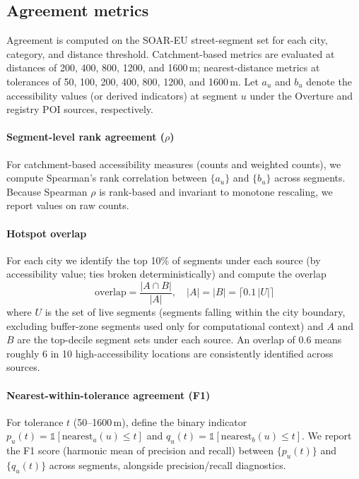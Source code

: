 \subsection{Agreement metrics}
\label{sec:poi-supp-metrics}

Agreement is computed on the SOAR-EU street-segment set for each city, category, and distance threshold. Catchment-based metrics are evaluated at distances of 200, 400, 800, 1200, and 1600\,m; nearest-distance metrics at tolerances of 50, 100, 200, 400, 800, 1200, and 1600\,m. Let $a_u$ and $b_u$ denote the accessibility values (or derived indicators) at segment $u$ under the Overture and registry POI sources, respectively.

\paragraph{Segment-level rank agreement ($\rho$)} For catchment-based accessibility measures (counts and weighted counts), we compute Spearman's rank correlation between $\{a_u\}$ and $\{b_u\}$ across segments. Because Spearman $\rho$ is rank-based and invariant to monotone rescaling, we report values on raw counts.

\paragraph{Hotspot overlap} For each city we identify the top 10\% of segments under each source (by accessibility value; ties broken deterministically) and compute the overlap
\[
  \mathrm{overlap}=\frac{|A\cap B|}{|A|},\quad |A|=|B|=\lceil 0.1\,|U|\rceil
\]
where $U$ is the set of live segments (segments falling within the city boundary, excluding buffer-zone segments used only for computational context) and $A$ and $B$ are the top-decile segment sets under each source. An overlap of 0.6 means roughly 6 in 10 high-accessibility locations are consistently identified across sources.

\paragraph{Nearest-within-tolerance agreement (F1)} For tolerance $t$ (50--1600\,m), define the binary indicator $p_u(t)=\mathbb{1}[\mathrm{nearest}_a(u)\leq t]$ and $q_u(t)=\mathbb{1}[\mathrm{nearest}_b(u)\leq t]$. We report the F1 score (harmonic mean of precision and recall) between $\{p_u(t)\}$ and $\{q_u(t)\}$ across segments, alongside precision/recall diagnostics.


